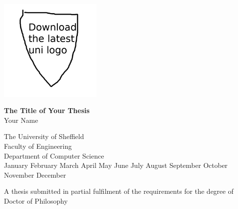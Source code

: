 \newcommand{\MONTH}{%
  \ifcase\the\month
  \or January%
  \or February%
  \or March%
  \or April%
  \or May%
  \or June%
  \or July%
  \or August%
  \or September%
  \or October%
  \or November%
  \or December%
  \fi}

\hypersetup{pageanchor=false}
\begin{titlepage}
  \begin{center}
    \includegraphics[width=5cm]{figures/uni-logo.png}\\[1cm]

    \linespread{1.2}

    \huge{\bfseries The Title of Your Thesis}\\[1.5cm]
    \huge{Your Name\\[1cm]}

    \linespread{1}
    \LARGE{The University of Sheffield}\\[1cm]
    \Large{Faculty of Engineering}\\
    \Large{Department of Computer Science}\\[2cm]
    \MONTH~\the\year

    \vfill
    \normalsize{A thesis submitted in partial fulfilment of the requirements for the degree of\\Doctor of Philosophy}
  \end{center}
  \afterpage{\blankpage}
  \vspace{1.5cm}
\end{titlepage}
\hypersetup{pageanchor=true}
